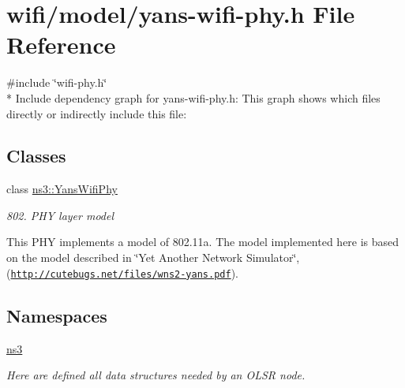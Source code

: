 \hypertarget{yans-wifi-phy_8h}{}\section{wifi/model/yans-\/wifi-\/phy.h File Reference}
\label{yans-wifi-phy_8h}
{\ttfamily \#include \char`\"{}wifi-\/phy.\+h\char`\"{}}\\*
Include dependency graph for yans-\/wifi-\/phy.h\+:
This graph shows which files directly or indirectly include this file\+:
\subsection*{Classes}
\begin{DoxyCompactItemize}
\item 
class \hyperlink{classns3_1_1YansWifiPhy}{ns3\+::\+Yans\+Wifi\+Phy}
\begin{DoxyCompactList}\small\item\em 802. P\+HY layer model

This P\+HY implements a model of 802.\+11a. The model implemented here is based on the model described in \char`\"{}\+Yet Another Network Simulator\char`\"{}, (\href{http://cutebugs.net/files/wns2-yans.pdf}{\tt http\+://cutebugs.\+net/files/wns2-\/yans.\+pdf}). \end{DoxyCompactList}\end{DoxyCompactItemize}
\subsection*{Namespaces}
\begin{DoxyCompactItemize}
\item 
 \hyperlink{namespacens3}{ns3}
\begin{DoxyCompactList}\small\item\em Here are defined all data structures needed by an O\+L\+SR node. \end{DoxyCompactList}\end{DoxyCompactItemize}
